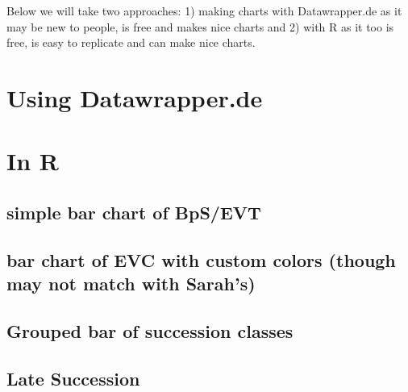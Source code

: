 \documentclass[
  letterpaper,
  DIV=11,
  numbers=noendperiod]{scrreprt}
\begin{document}
Below we will take two approaches: 1) making charts with Datawrapper.de
as it may be new to people, is free and makes nice charts and 2) with R
as it too is free, is easy to replicate and can make nice charts.

\hypertarget{using-datawrapper.de}{%
\section{Using Datawrapper.de}\label{using-datawrapper.de}}

\hypertarget{in-r}{%
\section{In R}\label{in-r}}

\hypertarget{simple-bar-chart-of-bpsevt}{%
\subsection{simple bar chart of
BpS/EVT}\label{simple-bar-chart-of-bpsevt}}

\hypertarget{bar-chart-of-evc-with-custom-colors-though-may-not-match-with-sarahs}{%
\subsection{bar chart of EVC with custom colors (though may not match
with
Sarah's)}\label{bar-chart-of-evc-with-custom-colors-though-may-not-match-with-sarahs}}

\hypertarget{grouped-bar-of-succession-classes}{%
\subsection{Grouped bar of succession
classes}\label{grouped-bar-of-succession-classes}}

\hypertarget{late-succession}{%
\subsection{Late Succession}\label{late-succession}}
\end{document}
